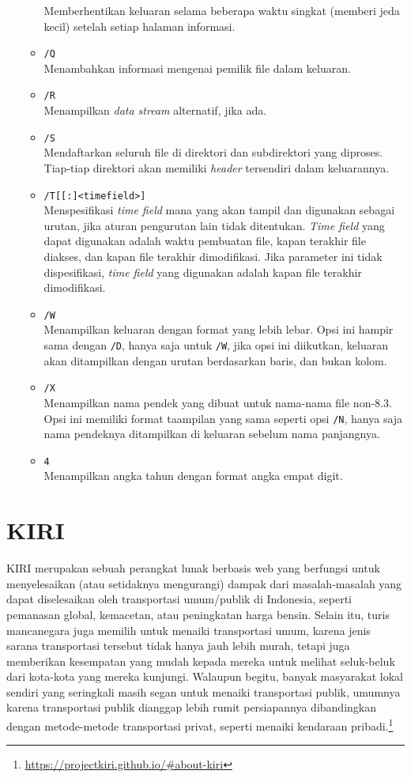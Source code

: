 \begin{itemize}
\begin{itemize}
		Memberhentikan keluaran selama beberapa waktu singkat (memberi jeda kecil) setelah setiap halaman informasi.
		\item \verb|/Q|\\
		Menambahkan informasi mengenai pemilik file dalam keluaran.
		\item \verb|/R|\\
		Menampilkan \textit{data stream} alternatif, jika ada.
		\item \verb|/S|\\
		Mendaftarkan seluruh file di direktori dan subdirektori yang diproses. Tiap-tiap direktori akan memiliki \textit{header} tersendiri dalam keluarannya.
		\item \verb|/T[[:]<timefield>]|\\
		Menspesifikasi \textit{time field} mana yang akan tampil dan digunakan sebagai urutan, jika aturan pengurutan lain tidak ditentukan. \textit{Time field} yang dapat digunakan adalah waktu pembuatan file, kapan terakhir file diakses, dan kapan file terakhir dimodifikasi. Jika parameter ini tidak dispesifikasi, \textit{time field} yang digunakan adalah kapan file terakhir dimodifikasi.
		\item \verb|/W|\\
		Menampilkan keluaran dengan format yang lebih lebar. Opsi ini hampir sama dengan \verb|/D|, hanya saja untuk \verb|/W|, jika opsi ini diikutkan, keluaran akan ditampilkan dengan urutan berdasarkan baris, dan bukan kolom.
		\item \verb|/X|\\
		Menampilkan nama pendek yang dibuat untuk nama-nama file non-8.3. Opsi ini memiliki format taampilan yang sama seperti opsi \verb|/N|, hanya saja nama pendeknya ditampilkan di keluaran sebelum nama panjangnya.
		\item \verb|4|\\
		Menampilkan angka tahun dengan format angka empat digit.
	\end{itemize}
\end{itemize}

\section{KIRI}
\label{sec:kiri}

KIRI merupakan sebuah perangkat lunak berbasis web yang berfungsi untuk menyelesaikan (atau setidaknya mengurangi) dampak dari masalah-masalah yang dapat diselesaikan oleh transportasi umum/publik di Indonesia, seperti pemanasan global, kemacetan, atau peningkatan harga bensin. Selain itu, turis mancanegara juga memilih untuk menaiki transportasi umum, karena jenis sarana transportasi tersebut tidak hanya jauh lebih murah, tetapi juga memberikan kesempatan yang mudah kepada mereka untuk melihat seluk-beluk dari kota-kota yang mereka kunjungi. Walaupun begitu, banyak masyarakat lokal sendiri yang seringkali masih segan untuk menaiki transportasi publik, umumnya karena transportasi publik dianggap lebih rumit persiapannya dibandingkan dengan metode-metode transportasi privat, seperti menaiki kendaraan pribadi.\footnote{\href{https://projectkiri.github.io/\#about-kiri}{https://projectkiri.github.io/\#about-kiri}}

